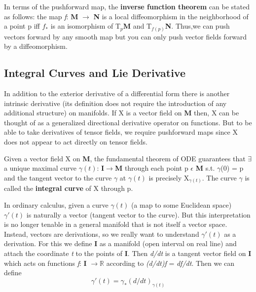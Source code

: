 In terms of the pushforward map, the \textbf{inverse function theorem} can be stated as follows:
the map \textit{f}: \textbf{M} $\rightarrow$ \textbf{N} is a local diffeomorphism in the neighborhood of a point p 
iff $f_*$ is an isomorphism of T$_p$\textbf{M} and T$_{f(p)}$\textbf{N}.
Thus,we can push vectors forward by any smooth map but you can only push vector
fields forward by a diffeomorphism.

\subsection{Integral Curves and Lie Derivative}
In addition to the exterior derivative of a differential form there is another intrinsic derivative (its definition does not require the introduction of any additional structure) on manifolds. 
If X is a vector field on \textbf{M} then, X can be thought of as a generalized directional derivative operator on functions. 
But to be able to take derivatives of tensor fields, we require pushforward maps since X does not appear to act directly on tensor fields. 

Given a vector field X on \textbf{M}, the fundamental theorem of ODE guarantees that $\exists$ a unique maximal curve $\gamma(t)$: \textbf{I}$\rightarrow$\textbf{M} through
each point p $\epsilon$ \textbf{M} s.t. $\gamma$(0) = p and the tangent vector to the curve $\gamma$ at $\gamma(t)$ is precisely X$_{\gamma(t)}$. 
The curve $\gamma$ is called the \textbf{integral curve} of X through p.

In ordinary calculus, given a curve $\gamma(t)$ (a map to some Euclidean space) $\gamma'(t)$ is naturally a vector (tangent vector to the curve).
But this interpretation is no longer tenable in a general manifold that is not itself a vector space. 
Instead, vectors are derivations, so we really want to understand $\gamma'(t)$ as a derivation.
For this we define \textbf{I} as a manifold (open interval on real line) and attach the coordinate \textit{t} to the points of \textbf{I}. 
Then \textit{d/dt} is a tangent vector field on \textbf{I} which acts on functions \textit{f}: \textbf{I} $\rightarrow \mathbb{R}$ according to \textit{(d/dt)f} = \textit{df/dt}.
Then we can define
\begin{equation}
    \gamma'(t) = \gamma_*(d/dt)_{\gamma(t)}
\end{equation}

